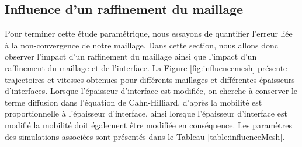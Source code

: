 \subsection{Influence d'un raffinement du maillage} \label{sec:raffinement}
Pour terminer cette étude paramétrique, nous essayons de quantifier l'erreur liée à la non-convergence de notre maillage. Dans cette section, nous allons donc observer l'impact d'un raffinement du maillage ainsi que l'impact d'un raffinement du maillage et de l'interface. La Figure \ref{fig:influencemesh} présente trajectoires et vitesses obtenues pour différents maillages et différentes épaisseurs d'interfaces.
Lorsque l'épaisseur d'interface est modifiée, on cherche à conserver le terme diffusion dans l'équation de Cahn-Hilliard, d'après \cite{cardon_modelisation_2016,zanella_three-dimensional_2021} la mobilité est proportionnelle à l'épaisseur d'interface, ainsi lorsque l'épaisseur d'interface est modifié la mobilité doit également être modifiée en conséquence. Les paramètres des simulations associées sont présentés dans le Tableau \ref{table:influenceMesh}.

